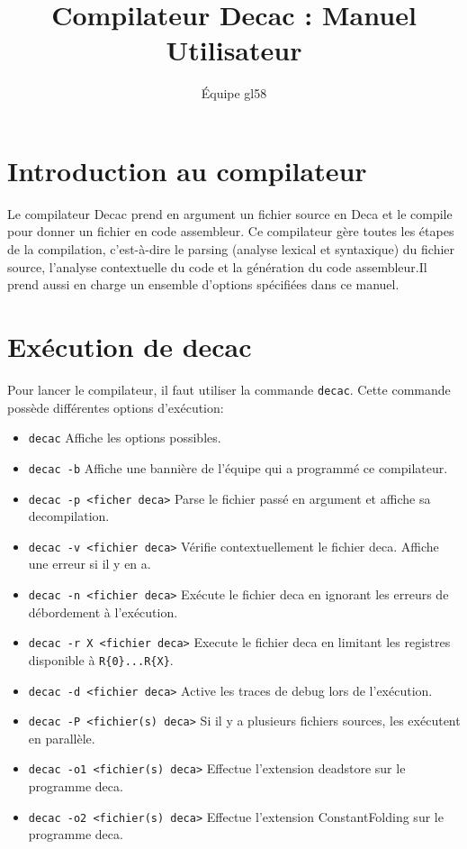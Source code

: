 \documentclass[a4paper, 10pt, french]{article}
\title{Compilateur Decac : Manuel Utilisateur}
\author{\'Equipe gl58}
\begin{document}
\maketitle
\section{Introduction au compilateur}
Le compilateur Decac prend en argument un fichier source en Deca et le compile pour donner un fichier en code assembleur. \newline
Ce compilateur gère toutes les étapes de la compilation, c'est-à-dire le parsing (analyse lexical et syntaxique) du fichier source, l'analyse contextuelle du code et la génération du code assembleur.Il prend aussi en charge un ensemble d'options spécifiées dans ce manuel. 
\section{Ex\'ecution de decac}
Pour lancer le compilateur, il faut utiliser la commande \texttt{decac}. Cette commande possède différentes options d'exécution:
\begin{itemize}
    \item \texttt{decac}
    \newline
    Affiche les options possibles.
    \item \texttt{decac -b}
    \newline
    Affiche une banni\`ere de l'\'equipe qui a programm\'e ce compilateur.
    \item \texttt{decac -p <ficher deca>} \newline
    Parse le fichier pass\'e en argument et affiche sa decompilation.
    \item \texttt{decac -v <fichier deca>}
    \newline
    V\'erifie contextuellement le fichier deca. Affiche une erreur si il y en a.
    \item \texttt{decac -n <fichier deca>}
    \newline
    Exécute le fichier deca en ignorant les erreurs de débordement \`a l'exécution.
    \item \texttt{decac -r X <fichier deca>}
    \newline
    Execute le fichier deca en limitant les registres disponible \`a \texttt{R\{0\}...R\{X\}}.
    \item \texttt{decac -d <fichier deca>}
    \newline
    Active les traces de debug lors de l'exécution.
    \item{\texttt{decac -P <fichier(s) deca>}}
    \newline
    Si il y a plusieurs fichiers sources, les exécutent en parallèle.
    \item{\texttt{decac -o1 <fichier(s) deca>}}
    \newline
    Effectue l'extension deadstore sur le programme deca.
    \item{\texttt{decac -o2 <fichier(s) deca>}}
    \newline
    Effectue l'extension ConstantFolding sur le programme deca.

\end{itemize}
\end{document}
